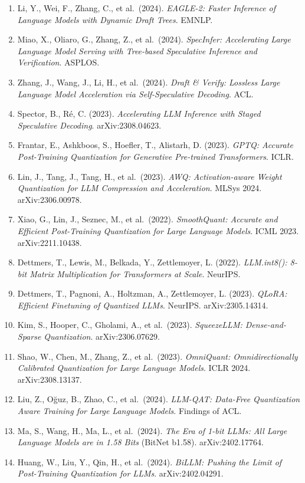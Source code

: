 \begin{enumerate}
\item
  Li, Y., Wei, F., Zhang, C., et al.~(2024). \emph{EAGLE-2: Faster Inference of Language Models with Dynamic Draft Trees}. EMNLP.
\item
  Miao, X., Oliaro, G., Zhang, Z., et al.~(2024). \emph{SpecInfer: Accelerating Large Language Model Serving with Tree-based Speculative Inference and Verification}. ASPLOS.
\item
  Zhang, J., Wang, J., Li, H., et al.~(2024). \emph{Draft \& Verify: Lossless Large Language Model Acceleration via Self-Speculative Decoding}. ACL.
\item
  Spector, B., Ré, C. (2023). \emph{Accelerating LLM Inference with Staged Speculative Decoding}. arXiv:2308.04623.
\item
  Frantar, E., Ashkboos, S., Hoefler, T., Alistarh, D. (2023). \emph{GPTQ: Accurate Post-Training Quantization for Generative Pre-trained Transformers}. ICLR.
\item
  Lin, J., Tang, J., Tang, H., et al.~(2023). \emph{AWQ: Activation-aware Weight Quantization for LLM Compression and Acceleration}. MLSys 2024. arXiv:2306.00978.
\item
  Xiao, G., Lin, J., Seznec, M., et al.~(2022). \emph{SmoothQuant: Accurate and Efficient Post-Training Quantization for Large Language Models}. ICML 2023. arXiv:2211.10438.
\item
  Dettmers, T., Lewis, M., Belkada, Y., Zettlemoyer, L. (2022). \emph{LLM.int8(): 8-bit Matrix Multiplication for Transformers at Scale}. NeurIPS.
\item
  Dettmers, T., Pagnoni, A., Holtzman, A., Zettlemoyer, L. (2023). \emph{QLoRA: Efficient Finetuning of Quantized LLMs}. NeurIPS. arXiv:2305.14314.
\item
  Kim, S., Hooper, C., Gholami, A., et al.~(2023). \emph{SqueezeLLM: Dense-and-Sparse Quantization}. arXiv:2306.07629.
\item
  Shao, W., Chen, M., Zhang, Z., et al.~(2023). \emph{OmniQuant: Omnidirectionally Calibrated Quantization for Large Language Models}. ICLR 2024. arXiv:2308.13137.
\item
  Liu, Z., Oğuz, B., Zhao, C., et al.~(2024). \emph{LLM-QAT: Data-Free Quantization Aware Training for Large Language Models}. Findings of ACL.
\item
  Ma, S., Wang, H., Ma, L., et al.~(2024). \emph{The Era of 1-bit LLMs: All Large Language Models are in 1.58 Bits} (BitNet b1.58). arXiv:2402.17764.
\item
  Huang, W., Liu, Y., Qin, H., et al.~(2024). \emph{BiLLM: Pushing the Limit of Post-Training Quantization for LLMs}. arXiv:2402.04291.

\end{enumerate}
